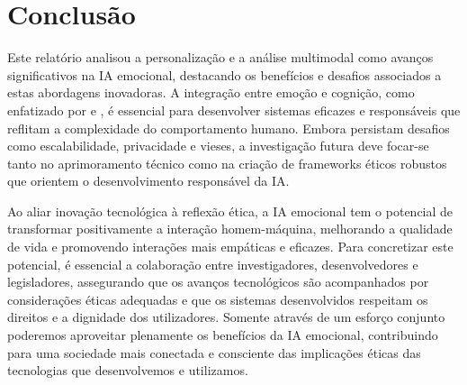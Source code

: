 \documentclass[a4paper,12pt]{report}
\begin{document}
	\section{Conclusão}
	
	Este relatório analisou a personalização e a análise multimodal como avanços significativos na IA emocional, destacando os benefícios e desafios associados a estas abordagens inovadoras. A integração entre emoção e cognição, como enfatizado por \textcite{picard1997} e \textcite{haidt2001}, é essencial para desenvolver sistemas eficazes e responsáveis que reflitam a complexidade do comportamento humano. Embora persistam desafios como escalabilidade, privacidade e vieses, a investigação futura deve focar-se tanto no aprimoramento técnico como na criação de frameworks éticos robustos que orientem o desenvolvimento responsável da IA.
	
	Ao aliar inovação tecnológica à reflexão ética, a IA emocional tem o potencial de transformar positivamente a interação homem-máquina, melhorando a qualidade de vida e promovendo interações mais empáticas e eficazes. Para concretizar este potencial, é essencial a colaboração entre investigadores, desenvolvedores e legisladores, assegurando que os avanços tecnológicos são acompanhados por considerações éticas adequadas e que os sistemas desenvolvidos respeitam os direitos e a dignidade dos utilizadores. Somente através de um esforço conjunto poderemos aproveitar plenamente os benefícios da IA emocional, contribuindo para uma sociedade mais conectada e consciente das implicações éticas das tecnologias que desenvolvemos e utilizamos.
	
	\newpage
	
	\printbibliography
\end{document}
